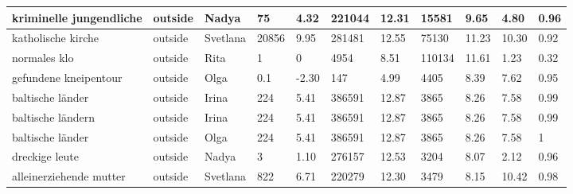 \begin{longtable}{|p{3cm}|p{1cm}|p{1cm}|R{0.8cm}|R{0.8cm}|R{1.2cm}|R{1cm}|R{1.3cm}|R{1cm}|R{0.8cm}|R{0.6cm}|}
kriminelle jungendliche                                            & outside     & Nadya     & 75                  & 4.32                      & 221044     & 12.31            & 15581        & 9.65                  & 4.80  & 0.96                 \\ \hline
katholische kirche                                                 & outside     & Svetlana  & 20856               & 9.95                      & 281481     & 12.55            & 75130        & 11.23                 & 10.30 & 0.92                 \\ \hline
normales klo                                                       & outside     & Rita      & 1                   & 0                      & 4954       & 8.51             & 110134       & 11.61                 & 1.23  & 0.32                 \\ \hline
gefundene kneipentour                                              & outside     & Olga      & 0.1                 & -2.30                     & 147        & 4.99             & 4405         & 8.39                  & 7.62  & 0.95                 \\ \hline
baltische l\"{a}nder                                               & outside     & Irina     & 224                 & 5.41                      & 386591     & 12.87            & 3865         & 8.26                  & 7.58  & 0.99                 \\ \hline
baltische l\"{a}ndern                                              & outside     & Irina     & 224                 & 5.41                      & 386591     & 12.87            & 3865         & 8.26                  & 7.58  & 0.99                 \\ \hline
baltische l\"{a}nder                                               & outside     & Olga      & 224                 & 5.41                      & 386591     & 12.87            & 3865         & 8.26                  & 7.58  & 1                 \\ \hline
dreckige leute                                                     & outside     & Nadya     & 3                   & 1.10                      & 276157     & 12.53            & 3204         & 8.07                  & 2.12  & 0.96                 \\ \hline
alleinerziehende mutter                                            & outside     & Svetlana  & 822                 & 6.71                      & 220279     & 12.30            & 3479         & 8.15                  & 10.42 & 0.98                 \\ \hline

\end{longtable}
